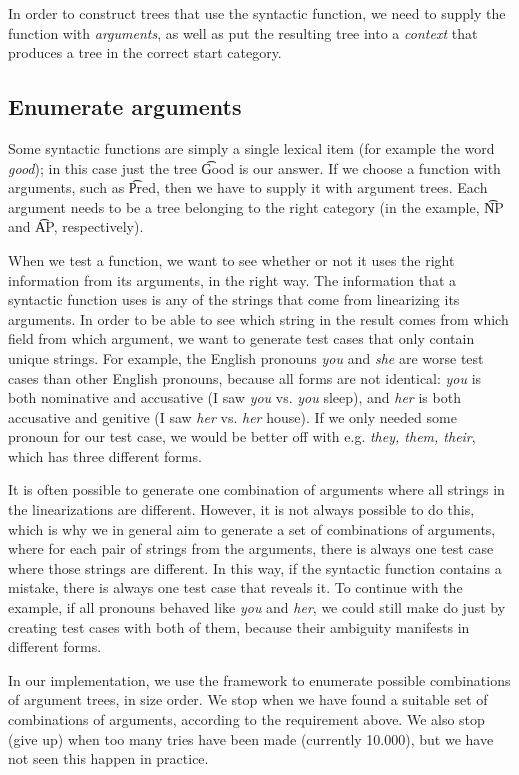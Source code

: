 In order to construct trees that use the syntactic function, we need
to supply the function with \emph{arguments}, as well as put the resulting tree
into a \emph{context} that produces a tree in the correct start
category.

\subsection{Enumerate arguments} Some syntactic functions are
simply a single lexical item (for example the word \emph{good}); in
this case just the tree \t{Good} is our answer.
If we choose a function with arguments, such as \t{Pred}, then we have
to supply it with argument trees. Each argument needs to be a
tree belonging to the right category (in the example, \t{NP} and
\t{AP}, respectively). 

When we test a function, we want to see whether or not it uses the
right information from its arguments, in the right way. The
information that a syntactic function uses is any of the strings that
come from linearizing its arguments. In order to be able to see which
string in the result comes from which field from which argument, we
want to generate test cases that only contain unique strings.
For example, the English pronouns {\em you} and {\em she} are worse
test cases than other English pronouns, because all forms are not
identical: {\em you} is both nominative and accusative (I saw {\em
  you} vs. {\em you} sleep), and {\em her} is both accusative and
genitive (I saw {\em her} vs. {\em her} house). 
If we only needed some pronoun for our test case, we would be better
off with e.g. {\em they, them, their}, which has three different forms. 

It is often possible to generate one combination of arguments where
all strings in the linearizations are different. However, it is not
always possible to do this, which is why we in general aim to generate
a set of combinations of arguments, where for each pair of strings
from the arguments, there is always one test case where those strings
are different. In this way, if the syntactic function contains a
mistake, there is always one test case that reveals it.
To continue with the example, if all pronouns behaved like {\em you}
and {\em her}, we could still make do just by creating test cases with
both of them, because their ambiguity manifests in different forms.

In our implementation, we use the \feat{} framework \cite{feat} to
enumerate possible combinations of argument trees, in size order. We
stop when we have found a suitable set of combinations of arguments,
according to the requirement above. We also stop (give up) when too
many tries have been made (currently 10.000), but we have not seen
this happen in practice.

